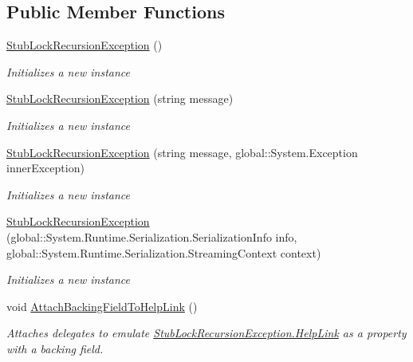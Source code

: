 \subsection*{Public Member Functions}
\begin{DoxyCompactItemize}
\item 
\hyperlink{class_system_1_1_threading_1_1_fakes_1_1_stub_lock_recursion_exception_a8eec6bc6bd89ab3ef1572d49de5646d4}{Stub\-Lock\-Recursion\-Exception} ()
\begin{DoxyCompactList}\small\item\em Initializes a new instance\end{DoxyCompactList}\item 
\hyperlink{class_system_1_1_threading_1_1_fakes_1_1_stub_lock_recursion_exception_abd62ef19364d4a90a6906d3edd08a5c3}{Stub\-Lock\-Recursion\-Exception} (string message)
\begin{DoxyCompactList}\small\item\em Initializes a new instance\end{DoxyCompactList}\item 
\hyperlink{class_system_1_1_threading_1_1_fakes_1_1_stub_lock_recursion_exception_acb4e765e90d7b4434d7d9ac5724b3d23}{Stub\-Lock\-Recursion\-Exception} (string message, global\-::\-System.\-Exception inner\-Exception)
\begin{DoxyCompactList}\small\item\em Initializes a new instance\end{DoxyCompactList}\item 
\hyperlink{class_system_1_1_threading_1_1_fakes_1_1_stub_lock_recursion_exception_abd1a862d384dc8b4f4bbf262986c593a}{Stub\-Lock\-Recursion\-Exception} (global\-::\-System.\-Runtime.\-Serialization.\-Serialization\-Info info, global\-::\-System.\-Runtime.\-Serialization.\-Streaming\-Context context)
\begin{DoxyCompactList}\small\item\em Initializes a new instance\end{DoxyCompactList}\item 
void \hyperlink{class_system_1_1_threading_1_1_fakes_1_1_stub_lock_recursion_exception_a610a83856c8233266f0b3dde84bd5b86}{Attach\-Backing\-Field\-To\-Help\-Link} ()
\begin{DoxyCompactList}\small\item\em Attaches delegates to emulate \hyperlink{class_system_1_1_threading_1_1_fakes_1_1_stub_lock_recursion_exception_a49f369d06aa8c75fe8cf83d203924eef}{Stub\-Lock\-Recursion\-Exception.\-Help\-Link} as a property with a backing field.\end{DoxyCompactList}\item 

\end{DoxyCompactItemize}
